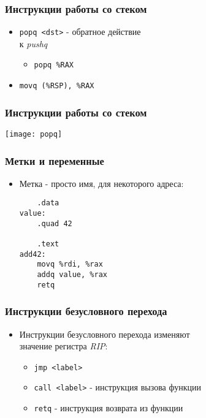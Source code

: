 \begin{frame}[fragile]
\frametitle{Инструкции работы со стеком}
\begin{itemize}
    \item<1->\lstinline|popq <dst>| - обратное действие\\
    к \emph{pushq}
    \begin{itemize}
        \item<2->\lstinline|popq %RAX|
    \end{itemize}
    \item<3->\lstinline|movq (%RSP), %RAX|
\end{itemize}
\end{frame}

\begin{frame}
\frametitle{Инструкции работы со стеком}
    \hspace*{\fill}
    \texttt{[image: popq]}
    \hspace*{\fill}\hspace*{\fill}
\end{frame}

\begin{frame}[fragile]
\frametitle{Метки и переменные}
\begin{itemize}
    \item<1->Метка - просто имя, для некоторого адреса:
    \begin{lstlisting}
	.data
value:
	.quad 42

	.text
add42:
	movq %rdi, %rax
	addq value, %rax
	retq
    \end{lstlisting}
\end{itemize}
\end{frame}

\begin{frame}[fragile]
\frametitle{Инструкции безусловного перехода}
\begin{itemize}
    \item<1-> Инструкции безусловного перехода изменяют\\
    значение регистра \emph{RIP}:
    \begin{itemize}
        \item<2->\lstinline|jmp <label>|
        \item<3->\lstinline|call <label>| - инструкция вызова функции
        \item<4->\lstinline|retq| - инструкция возврата из функции
    \end{itemize}
\end{itemize}
\end{frame}

